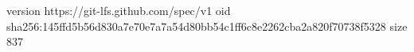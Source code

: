 version https://git-lfs.github.com/spec/v1
oid sha256:145ffd5b56d830a7e70e7a7a54d80bb54c1ff6c8e2262cba2a820f70738f5328
size 837
